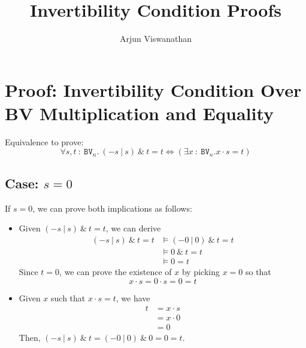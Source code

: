 \documentclass[11pt]{article}
\begin{document}
	\title{Invertibility Condition Proofs}
	\author{Arjun Viswanathan}
	\date{}
	\maketitle
	
\section*{Proof: Invertibility Condition Over BV Multiplication and Equality}
Equivalence to prove:
$$\forall s, t\ :\ \texttt{BV}_n.\ (-s\ |\ s)\ \&\ t = t
\iff (\exists x\ :\ \texttt{BV}_n. x \cdot s = t) 
$$
	
\subsection*{Case: $s = 0$}
If $s = 0$, we can prove both implications as follows:
\begin{itemize}
	\item Given $(-s\ |\ s)\ \&\ t = t$, we can derive
		\begin{align*}
			(-s\ |\ s)\ \&\ t = t &\models (-0\ |\ 0)\ \&\ t = t\\
			&\models 0\ \&\ t = t\\
			&\models 0 = t
		\end{align*}
		Since $t = 0$, we can prove the existence of $x$ by 
		picking $x = 0$ so that
		$$x \cdot s = 0 \cdot s = 0 = t$$
	\item Given $x$ such that $x \cdot s = t$, we have
		\begin{align*}
			t &= x \cdot s\\
			  &= x \cdot 0\\
			  &= 0
		\end{align*}
		Then, $(-s\ |\ s)\ \&\ t = (-0\ |\ 0)\ \&\ 0 = 0 = t$.
\end{itemize}
\end{document}
